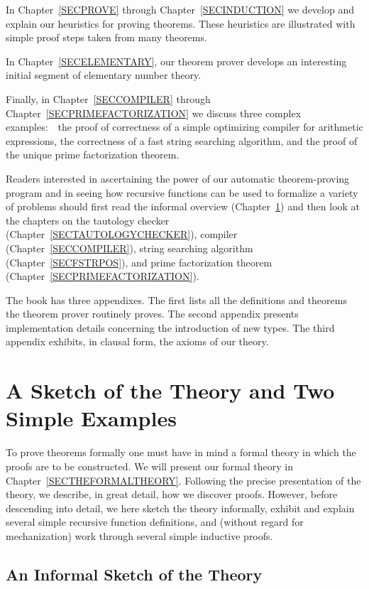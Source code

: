 \documentclass[11pt]{book}
\newcommand{\pubdefaulttextsize}{\large}
\begin{document}
In Chapter~\ref{SECPROVE} through Chapter~\ref{SECINDUCTION} we develop
and explain our heuristics for proving theorems.  These heuristics are
illustrated with simple proof steps taken from many theorems.

In Chapter~\ref{SECELEMENTARY}, our theorem prover develops an interesting
initial segment of elementary number theory.

Finally, in Chapter~\ref{SECCOMPILER} through Chapter~\ref{SECPRIMEFACTORIZATION} we
discuss three complex examples:~~the proof of correctness of
a simple optimizing compiler for arithmetic expressions, the
correctness of a fast string searching algorithm, and the proof of
the unique prime factorization theorem.

Readers interested in ascertaining the
power of our automatic theorem-proving program and in seeing how recursive functions
can be used to formalize a variety of problems should first read the informal
overview (Chapter~\ref{SECOVERVIEW}) and then look at the chapters
on the tautology checker (Chapter~\ref{SECTAUTOLOGYCHECKER}), compiler (Chapter~\ref{SECCOMPILER}),
string searching algorithm (Chapter~\ref{SECFSTRPOS}), and prime
factorization theorem (Chapter~\ref{SECPRIMEFACTORIZATION}).

The book has three appendixes.  The first lists all the definitions
and theorems the theorem prover routinely proves.
The second appendix presents implementation details concerning
the introduction of new types.
The third appendix exhibits, in clausal form, the  axioms of our
theory.
\chapter{A Sketch of the Theory and Two Simple Examples}
\label{SECOVERVIEW}
\pubdefaulttextsize
To prove theorems formally one must have in mind a formal theory in
which the proofs are to be constructed.  We will present our formal
theory in Chapter~\ref{SECTHEFORMALTHEORY}.  Following the precise presentation
of the theory, we describe, in great detail, how we discover
proofs.  However, before descending into detail, we here sketch the
theory informally, exhibit and explain several simple recursive function
definitions, and (without regard for mechanization) work through several
simple inductive proofs.
\section{An Informal Sketch of the Theory}
\pubdefaulttextsize
\end{document}

